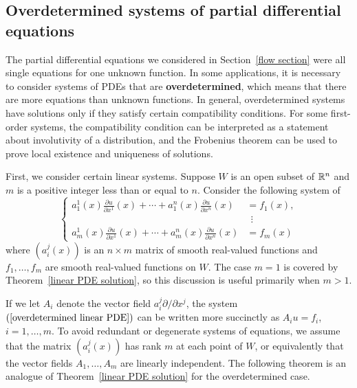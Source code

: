 \subsection{Overdetermined systems of partial differential equations}
The partial differential equations we considered in Section~\ref{flow section} were all single equations for one unknown function. In some applications, it is necessary to consider systems of PDEs that are \textbf{overdetermined}, which means that there are more equations than unknown functions. In general, overdetermined systems have solutions only if they satisfy certain compatibility conditions. For some first-order systems, the compatibility condition can be interpreted as a statement about involutivity of a distribution, and the Frobenius theorem can be used to prove local existence and uniqueness of solutions.\par
First, we consider certain linear systems. Suppose $W$ is an open subset of $\mathbb{R}^n$ and $m$ is a positive integer less than or equal to $n$. Consider the following system of
\begin{equation}\label{overdetermined linear PDE}
\left\{\begin{aligned}
a^1_1(x)\frac{\partial u}{\partial x^1}(x)+\cdots+a_1^n(x)\frac{\partial u}{\partial x^n}(x)&=f_1(x),\\
&\ \ \vdots\\
a^1_m(x)\frac{\partial u}{\partial x^1}(x)+\cdots+a_m^n(x)\frac{\partial u}{\partial x^n}(x)&=f_m(x)
\end{aligned}\right. 
\end{equation}
where $(a_i^j(x))$ is an $n\times m$ matrix of smooth real-valued functions and $f_1,\dots,f_m$ are smooth real-valued functions on $W$. The case $m=1$ is covered by Theorem~\ref{linear PDE solution}, so this discussion is useful primarily when $m>1$.\par
If we let $A_i$ denote the vector field $a^j_i\partial/\partial x^j$, the system $(\ref{overdetermined linear PDE})$ can be written more succinctly as $A_iu=f_i$, $i=1,\dots,m$. To avoid redundant or degenerate systems of equations, we assume that the matrix $(a_{i}^j(x))$ has rank $m$ at each point of $W$, or equivalently that the vector fields $A_1,\dots,A_m$ are linearly independent. The following theorem is an analogue of Theorem~\ref{linear PDE solution} for the overdetermined case.
